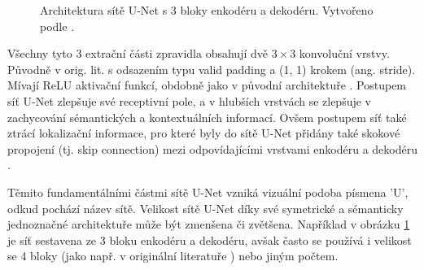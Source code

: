 \begin{figure}[H]

\caption[Příkladná architektura sítě U-Net]{Architektura sítě U-Net s 3 bloky enkodéru a dekodéru. Vytvořeno podle \cite{unet}. }
\label{fig:unetdiagram}

\end{figure}

Všechny tyto 3 extrační části zpravidla obsahují dvě $3\times3$ konvoluční vrstvy. Původně v orig. lit. s odsazením typu valid padding a (1, 1) krokem (ang. stride). Mívají ReLU aktivační funkcí, obdobně jako v původní architektuře \cite{unet}. Postupem síť U-Net zlepšuje své receptivní pole, a v hlubších vrstvách se zlepšuje v zachycování sémantických a kontextuálních informací. Ovšem postupem síť také ztrácí lokalizační informace, pro které byly do sítě U-Net přidány také skokové propojení (tj. skip connection) mezi odpovídajícími vrstvami enkodéru a dekodéru \cite{unet_success}.

Těmito fundamentálními částmi sítě U-Net vzniká vizuální podoba písmena 'U', odkud pochází název sítě. Velikost sítě U-Net díky své symetrické a sémanticky jednoznačné architektuře může být zmenšena či zvětšena. Například v obrázku \ref{fig:unetdiagram} je síť sestavena ze 3 bloku enkodéru a dekodéru, avšak často se používá i velikost se 4 bloky (jako např. v originální literatuře \cite{unet}) nebo jiným počtem.

